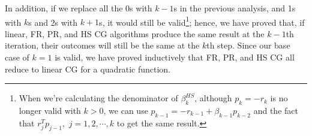 \documentclass[11pt]{article}
\begin{document}
In addition, if we replace all the 0s with $k-1$s in the previous analysis, and 1s with $k$s and 2s with $k+1$s, it would still be valid\footnote{When we're calculating the denominator of $\beta^{HS}_k$, although $p_k=-r_k$ is no longer valid with $k>0$, we can use $p_{k-1} = -r_{k-1} + \beta_{k-1}p_{k-2}$ and the fact that $r_{j}^Tp_{j-1},\,\,j = 1, 2, \cdots, k$ to get the same result.}; hence, we have proved that, if linear, FR, PR, and HS CG algorithms produce the same result at the ${k-1}$th iteration, their outcomes will still be the same at the $k$th step. Since our base case of $k=1$ is valid, we have proved inductively that FR, PR, and HS CG all reduce to linear CG for a quadratic function. 
\end{document}
